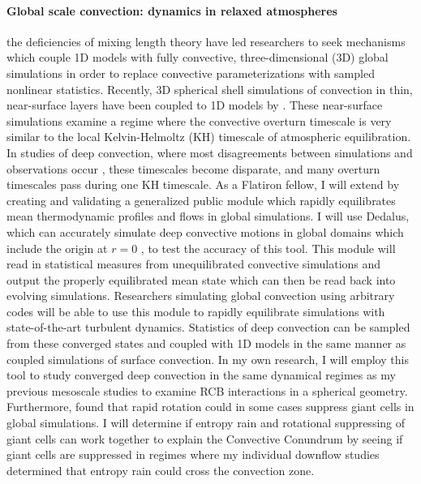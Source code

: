 \documentclass[onecolumn, hmargin=1in, vmargin=1in]{aastex62}
\begin{document}
\paragraph{Global scale convection: dynamics in relaxed atmospheres}
the deficiencies of mixing length theory have led researchers to seek mechanisms which couple 1D models with fully convective, three-dimensional (3D) global simulations in order to replace convective parameterizations with sampled nonlinear statistics.
Recently, 3D spherical shell simulations of convection in thin, near-surface layers have been coupled to 1D models by \citet{jorgensen&weiss2019}.
These near-surface simulations examine a regime where the convective overturn timescale is very similar to the local Kelvin-Helmoltz (KH) timescale of atmospheric equilibration.
In studies of deep convection, where most disagreements between simulations and observations occur \citep[the Convective Conundrum,][]{hanasoge&all2015}, these timescales become disparate, and many overturn timescales pass during one KH timescale.
As a Flatiron fellow, I will extend \citet{anders&all2018} by creating and validating a generalized public module which rapidly equilibrates mean thermodynamic profiles and flows in global simulations.
I will use Dedalus, which can accurately simulate deep convective motions in global domains which include the origin at $r = 0$ \citep{lecoanet&all2019}, to test the accuracy of this tool.
This module will read in statistical measures from unequilibrated convective simulations and output the properly equilibrated mean state which can then be read back into evolving simulations.
Researchers simulating global convection using arbitrary codes will be able to use this module to rapidly equilibrate simulations with state-of-the-art turbulent dynamics.
Statistics of deep convection can be sampled from these converged states and coupled with 1D models in the same manner as \citet{jorgensen&weiss2019} coupled simulations of surface convection.
In my own research, I will employ this tool to study converged deep convection in the same dynamical regimes as my previous mesoscale studies to examine RCB interactions in a spherical geometry.
Furthermore, \citet{featherstone&hindman2016} found that rapid rotation could in some cases suppress giant cells in global simulations.
I will determine if entropy rain and rotational suppressing of giant cells can work together to explain the Convective Conundrum by seeing if giant cells are suppressed in regimes where my individual downflow studies determined that entropy rain could cross the convection zone.
\end{document}
